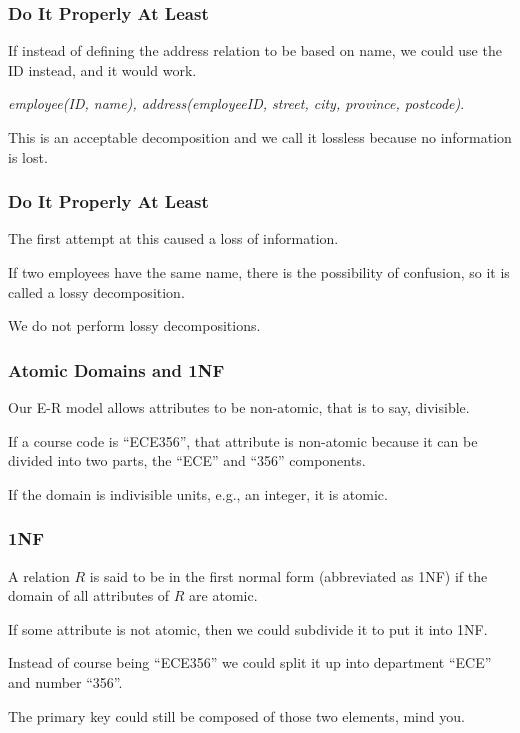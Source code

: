 \begin{frame}
\frametitle{Do It Properly At Least}

If instead of defining the address relation to be based on name, we could use the ID instead, and it would work. 

\textit{employee(ID, name), address(employeeID, street, city, province, postcode)}. 

This is an acceptable decomposition and we call it \alert{lossless} because no information is lost. 

\end{frame}


\begin{frame}
\frametitle{Do It Properly At Least}


The first attempt at this caused a loss of information.

If two employees have the same name, there is the possibility of confusion, so it is called a \alert{lossy} decomposition. 

We do not perform lossy decompositions.

\end{frame}


\begin{frame}
\frametitle{Atomic Domains and 1NF}

Our E-R model allows attributes to be non-atomic, that is to say, divisible. 

If a course code is ``ECE356'', that attribute is non-atomic because it can be divided into two parts, the ``ECE'' and ``356'' components. 

If the domain is indivisible units, e.g., an integer, it is atomic.

\end{frame}



\begin{frame}
\frametitle{1NF}

A relation $R$ is said to be in the \alert{first normal form} (abbreviated as 1NF) if the domain of all attributes of $R$ are atomic. 

If some attribute is not atomic, then we could subdivide it to put it into 1NF. 

Instead of course being ``ECE356'' we could split  it up into department ``ECE'' and number ``356''. 

The primary key could still be composed of those two elements, mind you.


\end{frame}



